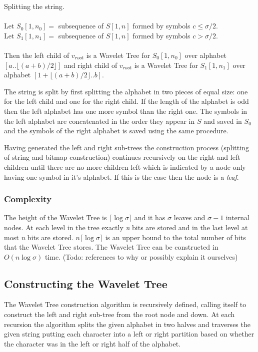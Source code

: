 \vspace{0.5 cm}
\begin{mdframed}[nobreak, linecolor=lightgray]
\begin{definition} Splitting the string. \\\\
Let $S_0[1,n_0] =$ subsequence of $S[1,n]$ formed by symbols $c \leq \sigma/2$.\\
Let $S_1[1,n_1] =$ subsequence of $S[1,n]$ formed by symbols $c > \sigma/2$.\\\\
Then the left child of $v_{root}$ is a Wavelet Tree for $S_0[1,n_0]$ over alphabet $[a .. \lfloor (a + b)/2 \rfloor]$ and right child of $v_{root}$ is a Wavelet Tree for $S_1[1,n_1]$ over alphabet $[1 + \lfloor (a + b)/2 \rfloor .. b]$. 
\end{definition}
\end{mdframed}
\vspace{0.5 cm}

The string is split by first splitting the alphabet in two pieces of equal size: one for the left child and one for the right child.
If the length of the alphabet is odd then the left alphabet has one more symbol than the right one. 
The symbols in the left alphabet are concatenated in the order they appear in $S$ and saved in $S_0$ and the symbols of the right alphabet is saved using the same procedure.
 
Having generated the left and right sub-trees the construction process (splitting of string and bitmap construction) continues recursively on the right and left children until there are no more children left which is indicated by a node only having one symbol in it's alphabet.
If this is the case then the node is a \textit{leaf}.

\subsubsection{Complexity}
The height of the Wavelet Tree is  $\lceil \log \sigma \rceil$ and it has $\sigma$ leaves and $\sigma - 1$ internal nodes. 
At each level in the tree exactly \textit{n} bits are stored and in the last level at most \textit{n} bits are stored. $n \lceil \log \sigma \rceil$ is an upper bound to the total number of bits that the Wavelet Tree stores. 
The Wavelet Tree can be constructed in $O(n \log \sigma)$ time. 
(Todo: references to why or possibly explain it ourselves)


\subsection{Constructing the Wavelet Tree}
\label{sec:nodeconstruction}
The Wavelet Tree construction algorithm is recursively defined, calling itself to construct the left and right sub-tree from the root node and down. At each recursion the algorithm splits the given alphabet in two halves and traverses the given string putting each character into a left or right partition based on whether the character was in the left or right half of the alphabet.

